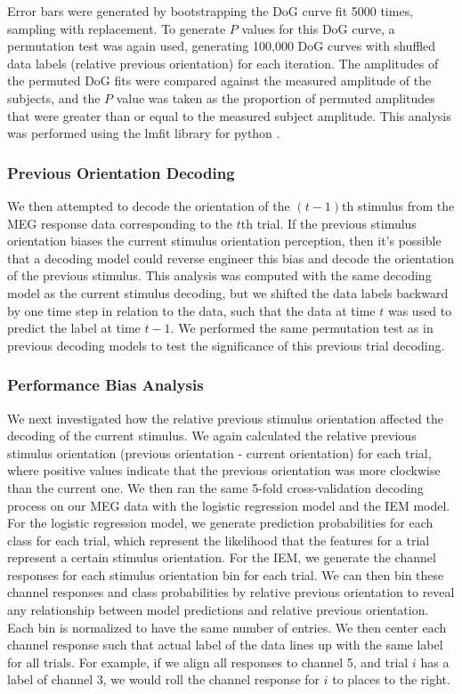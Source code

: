 \documentclass[../main.tex]{subfiles}
\begin{document}
Error bars were generated by bootstrapping the DoG curve fit 5000 times, sampling with replacement. To generate $P$ values for this DoG curve, a permutation test was again used, generating 100,000 DoG curves with shuffled data labels (relative previous orientation) for each iteration. The amplitudes of the permuted DoG fits were compared against the measured amplitude of the subjects, and the $P$ value was taken as the proportion of permuted amplitudes that were greater than or equal to the measured subject amplitude. This analysis was performed using the lmfit library for python \citep{newville_matthew_2014_11813}.

\subsubsection{Previous Orientation Decoding}
We then attempted to decode the orientation of the $(t-1)$th stimulus from the MEG response data corresponding to the $t$th trial. If the previous stimulus orientation biases the current stimulus orientation perception, then it's possible that a decoding model could reverse engineer this bias and decode the orientation of the previous stimulus. This analysis was computed with the same decoding model as the current stimulus decoding, but we shifted the data labels backward by one time step in relation to the data, such that the data at time $t$ was used to predict the label at time $t - 1$. We performed the same permutation test as in previous decoding models to test the significance of this previous trial decoding.

\subsubsection{Performance Bias Analysis}
We next investigated how the relative previous stimulus orientation affected the decoding of the current stimulus. We again calculated the relative previous stimulus orientation (previous orientation - current orientation) for each trial, where positive values indicate that the previous orientation was more clockwise than the current one. We then ran the same 5-fold cross-validation decoding process on our MEG data with the logistic regression model and the IEM model. For the logistic regression model, we generate prediction probabilities for each class for each trial, which represent the likelihood that the features for a trial represent a certain stimulus orientation. For the IEM, we generate the channel responses for each stimulus orientation bin for each trial. We can then bin these channel responses and class probabilities by relative previous orientation to reveal any relationship between model predictions and relative previous orientation. Each bin is normalized to have the same number of entries. We then center each channel response such that actual label of the data lines up with the same label for all trials. For example, if we align all responses to channel 5, and trial $i$ has a label of channel 3, we would roll the channel response for $i$ to places to the right. 
\end{document}
